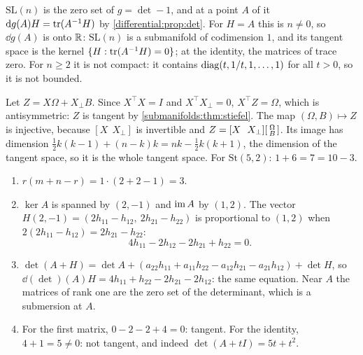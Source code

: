 $\mathrm{SL}(n)$ is the zero set of $g = \det - 1$, and at a point $A$ of
it $\mathrm{d} g(A)H = \operatorname{tr}(A^{-1}H)$ by \cref{differential:prop:det}. For
$H = A$ this is $n\neq0$, so $\dd g(A)$ is onto $\mathbb{R}$: $\mathrm{SL}(n)$ is
a submanifold of codimension $1$, and its tangent space is the kernel
$\{H : \operatorname{tr}(A^{-1}H) = 0\}$; at the identity, the matrices of trace zero.
For $n\geq2$ it is not compact: it contains
$\operatorname{diag}(t, 1/t, 1,\dots,1)$ for all $t > 0$, so it is not bounded.

Let $Z = X\Omega + X_\perp B$. Since $X^\top X = I$ and
$X^\top X_\perp = 0$, $X^\top Z = \Omega$, which is antisymmetric: $Z$ is
tangent by \cref{submanifolds:thm:stiefel}. The map
$(\Omega, B)\mapsto Z$ is injective, because
$[X\ \ X_\perp]$ is invertible and
$Z = [X\ \ X_\perp]\begin{bsmallmatrix}\Omega\\ B\end{bsmallmatrix}$.
Its image has dimension
$\frac12k(k - 1) + (n - k)k = nk - \frac12k(k + 1)$, the dimension of the
tangent space, so it is the whole tangent space. For
$\mathrm{St}(5, 2)$: $1 + 6 = 7 = 10 - 3$.

\begin{enumerate}[nosep]
  \item $r(m + n - r) = 1\cdot(2 + 2 - 1) = 3$.
  \item $\ker A$ is spanned by $(2, -1)$ and $\operatorname{im} A$ by $(1, 2)$. The
        vector $H(2, -1) = (2h_{11} - h_{12},\ 2h_{21} - h_{22})$ is
        proportional to $(1, 2)$ when
        $2(2h_{11} - h_{12}) = 2h_{21} - h_{22}$:
        \[
          4h_{11} - 2h_{12} - 2h_{21} + h_{22} = 0 .
        \]
  \item $\det(A + H) = \det A
        + (a_{22}h_{11} + a_{11}h_{22} - a_{12}h_{21} - a_{21}h_{12})
        + \det H$, so
        $\dd(\det)(A)H = 4h_{11} + h_{22} - 2h_{21} - 2h_{12}$: the same
        equation. Near $A$ the matrices of rank one are the zero set of
        the determinant, which is a submersion at $A$.
  \item For the first matrix, $0 - 2 - 2 + 4 = 0$: tangent. For the
        identity, $4 + 1 = 5\neq0$: not tangent, and indeed
        $\det(A + tI) = 5t + t^2$.
\end{enumerate}

